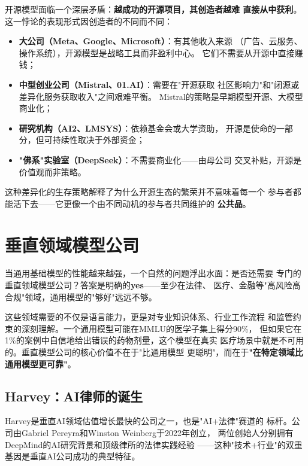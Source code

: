 \begin{corebox}[开源模型的商业化悖论]
开源模型面临一个深层矛盾：\textbf{越成功的开源项目，其创造者越难
直接从中获利}。这一悖论的表现形式因创造者的不同而不同：
\begin{itemize}
  \item \textbf{大公司（Meta、Google、Microsoft）}：有其他收入来源
    （广告、云服务、操作系统），开源模型是战略工具而非盈利中心。
    它们不需要从开源中直接赚钱；
  \item \textbf{中型创业公司（Mistral、01.AI）}：需要在"开源获取
    社区影响力"和"闭源或差异化服务获取收入"之间艰难平衡。
    Mistral的策略是早期模型开源、大模型商业化；
  \item \textbf{研究机构（AI2、LMSYS）}：依赖基金会或大学资助，
    开源是使命的一部分，但可持续性取决于外部资金；
  \item \textbf{"佛系"实验室（DeepSeek）}：不需要商业化——由母公司
    交叉补贴，开源是价值观而非策略。
\end{itemize}
这种差异化的生存策略解释了为什么开源生态的繁荣并不意味着每一个
参与者都能活下去——它更像一个由不同动机的参与者共同维护的
\textbf{公共品}。
\end{corebox}


\section{垂直领域模型公司}
\label{sec:models-domain}

当通用基础模型的性能越来越强，一个自然的问题浮出水面：是否还需要
专门的垂直领域模型公司？答案是明确的\textbf{yes}——至少在法律、
医疗、金融等"高风险高合规"领域，通用模型的"够好"远远不够。

这些领域需要的不仅是语言能力，更是对专业知识体系、行业工作流程
和监管约束的深刻理解。一个通用模型可能在MMLU的医学子集上得分90\%，
但如果它在1\%的案例中自信地给出错误的药物剂量，这个模型在真实
医疗场景中就是不可用的。垂直模型公司的核心价值不在于"比通用模型
更聪明"，而在于\textbf{"在特定领域比通用模型更可靠"}。

\subsection{Harvey：AI律师的诞生}
\label{subsec:ch03-harvey}

Harvey是垂直AI领域估值增长最快的公司之一，也是"AI+法律"赛道的
标杆。公司由Gabriel Pereyra和Winston Weinberg于2022年创立，
两位创始人分别拥有DeepMind的AI研究背景和顶级律所的法律实践经验
——这种"技术+行业"的双重基因是垂直AI公司成功的典型特征。

